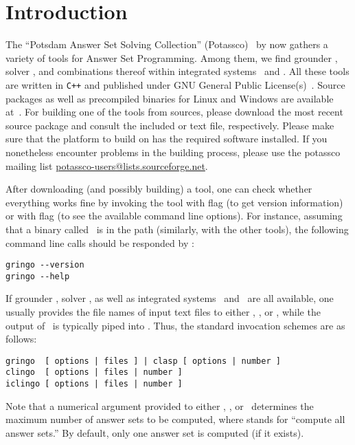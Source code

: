 \section{Introduction}\label{sec:introduction}

The ``Potsdam Answer Set Solving Collection'' (Potassco)~\cite{potassco}
by now gathers a variety of tools for Answer Set Programming.
Among them, we find grounder \gringo, solver \clasp, and
combinations thereof within integrated systems \clingo\ and \iclingo.
All these tools are written in \texttt{C++} and published under GNU General Public License(s)~\cite{GNUgpl}.
Source packages as well as precompiled binaries for Linux and Windows are available at~\cite{potassco}.
For building one of the tools from sources,
please download the most recent source package and consult the
included  or  text file, respectively.
Please make sure that the platform to build on has the
required software installed.
If you nonetheless encounter problems in the building process,
please use the potassco mailing list 
\href{mailto:potassco-users@lists.sourceforge.net}{potassco-users@lists.sourceforge.net}.

After downloading (and possibly building) a tool,
one can check whether everything works fine by invoking the tool
with flag  (to get version information) or
with flag  (to see the available command line options).
For instance, assuming that a binary called \gringo\ is in the path
(similarly, with the other tools),
the following command line calls should be responded by \gringo:
%
\begin{lstlisting}[numbers=none]
gringo --version
gringo --help
\end{lstlisting}
If grounder \gringo, solver \clasp, as well as integrated systems
\clingo\ and \iclingo\ are all available,
one usually provides the file names of input text files to either
\gringo, \clingo, or \iclingo, while the output of \gringo\ is
typically piped into \clasp.
Thus, the standard invocation schemes are as follows:
\begin{lstlisting}[numbers=none]
gringo  [ options | files ] | clasp [ options | number ]
clingo  [ options | files | number ]
iclingo [ options | files | number ]
\end{lstlisting}
Note that a numerical argument provided to either \clasp, \clingo, or \iclingo\
determines the maximum number of answer sets to be computed,
where  stands for ``compute all answer sets.''
By default, only one answer set is computed (if it exists).

